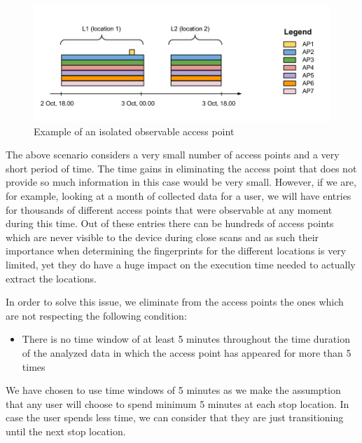 \begin{figure}[ht]
\centering
\includegraphics[height = 0.35\textwidth]{figures/isolated_ap.png}
\caption{Example of an isolated observable access point}
\label{isolated_ap}
\end{figure}

The above scenario considers a very small number of access points and a very
short period of time. The time gains in eliminating the access point that does
not provide so much information in this case would be very small. However, if we
are, for example, looking at a month of collected data for a user, we will have
entries for thousands of different access points that were observable at any
moment during this time. Out of these entries there can be hundreds of access
points which are never visible to the device during close scans and as such
their importance when determining the fingerprints for the different locations
is very limited, yet they do have a huge impact on the execution time needed to
actually extract the locations.

In order to solve this issue, we eliminate from the access points the ones which
are not respecting the following condition:
\begin{itemize}
  \item There is no time window of at least 5 minutes throughout the time
  duration of the analyzed data in which the access point has appeared for more
  than 5 times
\end{itemize}

We have chosen to use time windows of 5 minutes as we make the assumption that
any user will choose to spend minimum 5 minutes at each stop location. In case
the user spends less time, we can consider that they are just transitioning
until the next stop location.
